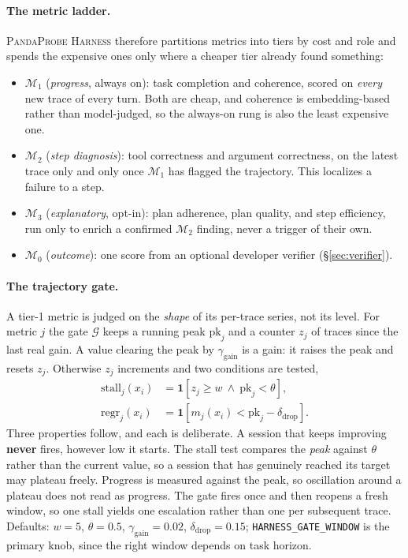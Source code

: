 \documentclass[11pt,letterpaper]{article}
\newcommand{\ind}{\mathbf{1}}
\newcommand{\Harness}{\textsc{PandaProbe Harness}\xspace}
\newcommand{\Mset}{\mathcal{M}}
\newcommand{\Gate}{\mathcal{G}}
\newcommand{\gwin}{w}
\newcommand{\gtarget}{\theta}
\newcommand{\ggain}{\gamma_{\mathrm{gain}}}
\newcommand{\gdrop}{\delta_{\mathrm{drop}}}
\begin{document}
\paragraph{The metric ladder.}
\Harness therefore partitions metrics into tiers by cost and role and spends the expensive ones only
where a cheaper tier already found something:
\begin{itemize}[leftmargin=*,itemsep=1pt]
\item $\Mset_1$ (\emph{progress}, always on): task completion and coherence, scored on
\emph{every} new trace of every turn. Both are cheap, and coherence is embedding-based rather
than model-judged, so the always-on rung is also the least expensive one.
\item $\Mset_2$ (\emph{step diagnosis}): tool correctness and argument correctness, on the
latest trace only and only once $\Mset_1$ has flagged the trajectory. This localizes a failure
to a step.
\item $\Mset_3$ (\emph{explanatory}, opt-in): plan adherence, plan quality, and step
efficiency, run only to enrich a confirmed $\Mset_2$ finding, never a trigger of their own.
\item $\Mset_0$ (\emph{outcome}): one score from an optional developer verifier
(\S\ref{sec:verifier}).
\end{itemize}

\paragraph{The trajectory gate.}
A tier-1 metric is judged on the \emph{shape} of its per-trace series, not its level. For metric $j$
the gate $\Gate$ keeps a running peak $\mathrm{pk}_j$ and a counter $z_j$ of traces since the last
real gain. A value clearing the peak by $\ggain$ is a gain: it raises the peak and resets $z_j$.
Otherwise $z_j$ increments and two conditions are tested,
\begin{align}
\mathrm{stall}_j(x_i)&=\ind\!\left[z_j\ge\gwin\ \wedge\ \mathrm{pk}_j<\gtarget\right],
  \label{eq:stall}\\
\mathrm{regr}_j(x_i) &=\ind\!\left[m_j(x_i)<\mathrm{pk}_j-\gdrop\right].
  \label{eq:regr}
\end{align}
Three properties follow, and each is deliberate. A session that keeps improving \textbf{never}
fires, however low it starts. The stall test compares the \emph{peak} against $\gtarget$ rather than
the current value, so a session that has genuinely reached its target may plateau freely. Progress
is measured against the peak, so oscillation around a plateau does not read as progress. The gate
fires once and then reopens a fresh window, so one stall yields one escalation rather than one per
subsequent trace. Defaults: $\gwin{=}5$, $\gtarget{=}0.5$, $\ggain{=}0.02$, $\gdrop{=}0.15$;
\texttt{HARNESS\_GATE\_WINDOW} is the primary knob, since the right window depends on task horizon.
\end{document}
